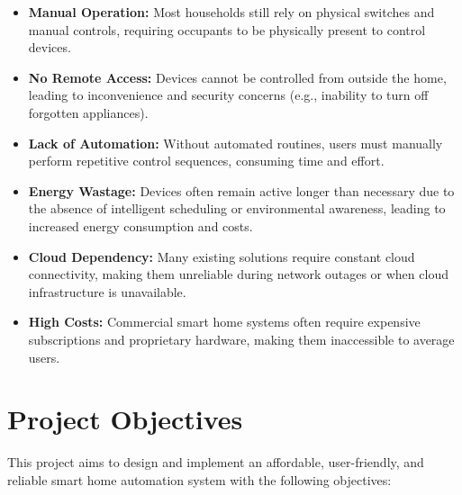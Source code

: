 \begin{itemize}
    \item \textbf{Manual Operation:} Most households still rely on physical switches and manual controls, requiring occupants to be physically present to control devices.
    
    \item \textbf{No Remote Access:} Devices cannot be controlled from outside the home, leading to inconvenience and security concerns (e.g., inability to turn off forgotten appliances).
    
    \item \textbf{Lack of Automation:} Without automated routines, users must manually perform repetitive control sequences, consuming time and effort.
    
    \item \textbf{Energy Wastage:} Devices often remain active longer than necessary due to the absence of intelligent scheduling or environmental awareness, leading to increased energy consumption and costs.
    
    \item \textbf{Cloud Dependency:} Many existing solutions require constant cloud connectivity, making them unreliable during network outages or when cloud infrastructure is unavailable.
    
    \item \textbf{High Costs:} Commercial smart home systems often require expensive subscriptions and proprietary hardware, making them inaccessible to average users.
\end{itemize}

\section{Project Objectives}

This project aims to design and implement an affordable, user-friendly, and reliable smart home automation system with the following objectives:

